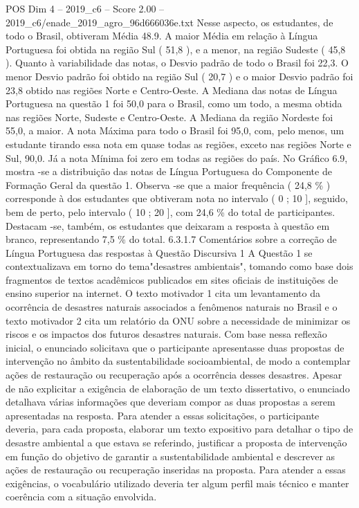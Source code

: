 \begin{textsample}{POS Dim 4 – 2019\_c6 – Score 2.00 – 2019\_c6/enade\_2019\_agro\_96d666036e.txt}
Nesse aspecto, os estudantes, de todo o Brasil, obtiveram Média 48.9.
A maior Média em relação à Língua Portuguesa foi obtida na região Sul ( 51,8 ), e a menor, na região Sudeste ( 45,8 ).
Quanto à variabilidade das notas, o Desvio padrão de todo o Brasil foi 22,3.
O menor Desvio padrão foi obtido na região Sul ( 20,7 ) e o maior Desvio padrão foi 23,8 obtido nas regiões Norte e Centro-Oeste.
A Mediana das notas de Língua Portuguesa na questão 1 foi 50,0 para o Brasil, como um todo, a mesma obtida nas regiões Norte, Sudeste e Centro-Oeste.
A Mediana da região Nordeste foi 55,0, a maior.
A nota Máxima para todo o Brasil foi 95,0, com, pelo menos, um estudante tirando essa nota em quase todas as regiões, exceto nas regiões Norte e Sul, 90,0.
Já a nota Mínima foi zero em todas as regiões do país.
No Gráfico 6.9, mostra -se a distribuição das notas de Língua Portuguesa do Componente de Formação Geral da questão 1.
Observa -se que a maior frequência ( 24,8 \% ) corresponde à dos estudantes que obtiveram nota no intervalo ( 0 ; 10 ], seguido, bem de perto, pelo intervalo ( 10 ; 20 ], com 24,6 \% do total de participantes.
Destacam -se, também, os estudantes que deixaram a resposta à questão em branco, representando 7,5 \% do total. 6.3.1.7 Comentários sobre a correção de Língua Portuguesa das respostas à Questão Discursiva 1 A Questão 1 se contextualizava em torno do tema"desastres ambientais", tomando como base dois fragmentos de textos acadêmicos publicados em sites oficiais de instituições de ensino superior na internet.
O texto motivador 1 cita um levantamento da ocorrência de desastres naturais associados a fenômenos naturais no Brasil e o texto motivador 2 cita um relatório da ONU sobre a necessidade de minimizar os riscos e os impactos dos futuros desastres naturais.
Com base nessa reflexão inicial, o enunciado solicitava que o participante apresentasse duas propostas de intervenção no âmbito da sustentabilidade socioambiental, de modo a contemplar ações de restauração ou recuperação após a ocorrência desses desastres.
Apesar de não explicitar a exigência de elaboração de um texto dissertativo, o enunciado detalhava várias informações que deveriam compor as duas propostas a serem apresentadas na resposta.
Para atender a essas solicitações, o participante deveria, para cada proposta, elaborar um texto expositivo para detalhar o tipo de desastre ambiental a que estava se referindo, justificar a proposta de intervenção em função do objetivo de garantir a sustentabilidade ambiental e descrever as ações de restauração ou recuperação inseridas na proposta.
Para atender a essas exigências, o vocabulário utilizado deveria ter algum perfil mais técnico e manter coerência com a situação envolvida.

\end{textsample}

